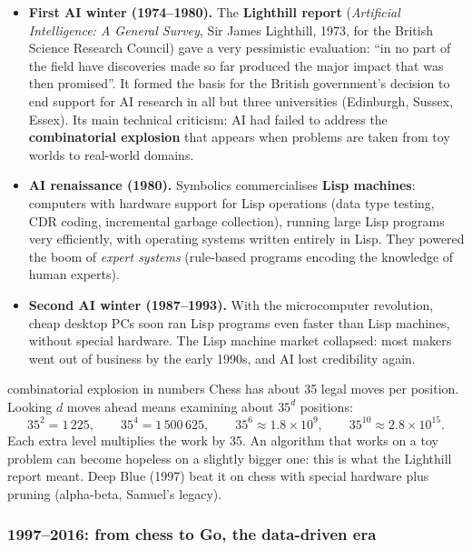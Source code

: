 \begin{itemize}
  \item \textbf{First AI winter (1974--1980).} The \textbf{Lighthill report} (\emph{Artificial
        Intelligence: A General Survey}, Sir James Lighthill, 1973, for the British Science
        Research Council) gave a very pessimistic evaluation: ``in no part of the field have
        discoveries made so far produced the major impact that was then promised''. It formed
        the basis for the British government's decision to end support for AI research in
        all but three universities (Edinburgh, Sussex, Essex). Its main technical criticism:
        AI had failed to address the \textbf{combinatorial explosion} that appears when
        problems are taken from toy worlds to real-world domains.
  \item \textbf{AI renaissance (1980).} Symbolics commercialises \textbf{Lisp machines}:
        computers with hardware support for Lisp operations (data type testing, CDR coding,
        incremental garbage collection), running large Lisp programs very efficiently, with
        operating systems written entirely in Lisp. They powered the boom of
        \emph{expert systems} (rule-based programs encoding the knowledge of human experts).
  \item \textbf{Second AI winter (1987--1993).} With the microcomputer revolution, cheap
        desktop PCs soon ran Lisp programs even faster than Lisp machines, without special
        hardware. The Lisp machine market collapsed: most makers went out of business by the
        early 1990s, and AI lost credibility again.
\end{itemize}

\begin{nbexample}{combinatorial explosion in numbers}
\notinslides
Chess has about 35 legal moves per position. Looking $d$ moves ahead means examining about
$35^d$ positions:
\[
35^2 = 1\,225, \qquad 35^4 = 1\,500\,625, \qquad 35^6 \approx 1.8 \times 10^{9}, \qquad
35^{10} \approx 2.8 \times 10^{15}.
\]
Each extra level multiplies the work by 35. An algorithm that works on a toy problem can
become hopeless on a slightly bigger one: this is what the Lighthill report meant. Deep Blue
(1997) beat it on chess with special hardware plus pruning (alpha-beta, Samuel's legacy).
\end{nbexample}

\subsubsection{1997--2016: from chess to Go, the data-driven era}

